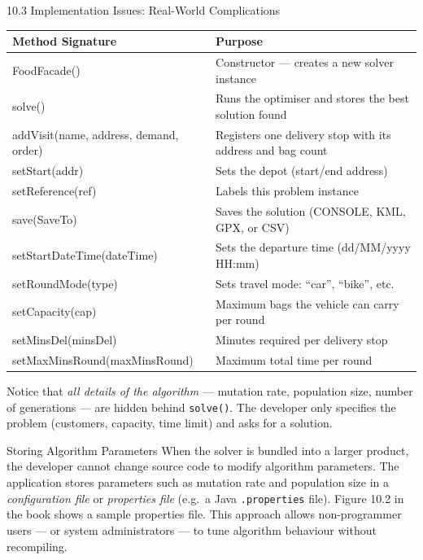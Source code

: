 \documentclass[aspectratio=169,10pt]{beamer}
\begin{document}
\begin{frame}[allowframebreaks]{10.3 Implementation Issues: Real-World Complications}
  \begin{center}
    \small
    \begin{tabular}{>{\ttfamily}lp{6.5cm}}
      \toprule
      \normalfont\textbf{Method Signature} & \textbf{Purpose} \\
      \midrule
      FoodFacade() & Constructor — creates a new solver instance \\
      solve() & Runs the optimiser and stores the best solution found \\
      addVisit(name, address, demand, order) & Registers one delivery stop with its address and bag count \\
      setStart(addr) & Sets the depot (start/end address) \\
      setReference(ref) & Labels this problem instance \\
      save(SaveTo) & Saves the solution (CONSOLE, KML, GPX, or CSV) \\
      setStartDateTime(dateTime) & Sets the departure time (dd/MM/yyyy HH:mm) \\
      setRoundMode(type) & Sets travel mode: ``car'', ``bike'', etc. \\
      setCapacity(cap) & Maximum bags the vehicle can carry per round \\
      setMinsDel(minsDel) & Minutes required per delivery stop \\
      setMaxMinsRound(maxMinsRound) & Maximum total time per round \\
      \bottomrule
    \end{tabular}
  \end{center}

  \medskip
  Notice that \emph{all details of the algorithm} — mutation rate,
  population size, number of generations — are hidden behind
  \texttt{solve()}.  The developer only specifies the problem
  (customers, capacity, time limit) and asks for a solution.

  \framebreak

  \begin{block}{Storing Algorithm Parameters}
    When the solver is bundled into a larger product, the developer
    cannot change source code to modify algorithm parameters.
    The application stores parameters such as mutation rate and
    population size in a \emph{configuration file} or \emph{properties
    file} (e.g.\ a Java \texttt{.properties} file).
    Figure 10.2 in the book shows a sample properties file.
    This approach allows non-programmer users — or system
    administrators — to tune algorithm behaviour without recompiling.
  \end{block}


\end{frame}
\end{document}
